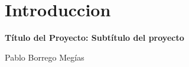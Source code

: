 \chapter{Introduccion}

\begin{center}
    {\large\bfseries Título del Proyecto: Subtítulo del proyecto}\\
    \end{center}
    \begin{center}
    Pablo Borrego Megías \\
    \end{center}